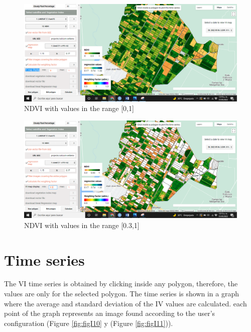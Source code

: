 \documentclass[
]{book}
\begin{document}
\begin{figure}

{\centering \includegraphics[width=0.85\linewidth]{./images/Figure58} 

}

\caption{NDVI with values in the range [0,1]}\label{fig:figI8}
\end{figure}

\begin{figure}

{\centering \includegraphics[width=0.85\linewidth]{./images/Figure59} 

}

\caption{NDVI with values in the range [0.3,1]}\label{fig:figI9}
\end{figure}

\hypertarget{time-series}{%
\section{Time series}\label{time-series}}

The VI time series is obtained by clicking inside any polygon, therefore, the values are only for the selected polygon. The time series is shown in a graph where the average and standard deviation of the IV values are calculated. each point of the graph represents an image found according to the user's configuration (Figure \ref{fig:figI10} y (Figure \ref{fig:figI11})).
\end{document}
